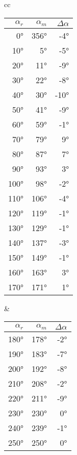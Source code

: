 \begin{tabular}{cc}
    \begin{minipage}{0.3\linewidth}
        \begin{tabular}{r|rr}
            $\alpha_r$ & $\alpha_m$ & $\Delta\alpha$ \\ \hline
            0°   & 356° & -4°  \\
            10°  & 5°   & -5°  \\
            20°  & 11°  & -9°  \\
            30°  & 22°  & -8°  \\
            40°  & 30°  & -10° \\
            50°  & 41°  & -9°  \\
            60°  & 59°  & -1°  \\
            70°  & 79°  & 9°   \\
            80°  & 87°  & 7°   \\
            90°  & 93°  & 3°   \\
            100° & 98°  & -2°  \\
            110° & 106° & -4°  \\
            120° & 119° & -1°  \\
            130° & 129° & -1°  \\
            140° & 137° & -3°  \\
            150° & 149° & -1°  \\
            160° & 163° & 3°   \\
            170° & 171° & 1°   \\
        \end{tabular}
    \end{minipage}
    &
    \begin{minipage}{0.3\linewidth}
        \begin{tabular}{r|rr}
            $\alpha_r$ & $\alpha_m$ & $\Delta\alpha$ \\ \hline
            180° & 178° & -2° \\
            190° & 183° & -7° \\
            200° & 192° & -8° \\
            210° & 208° & -2° \\
            220° & 211° & -9° \\
            230° & 230° & 0°  \\
            240° & 239° & -1° \\
            250° & 250° & 0°  \\

\end{tabular}
\end{minipage}
\end{tabular}
